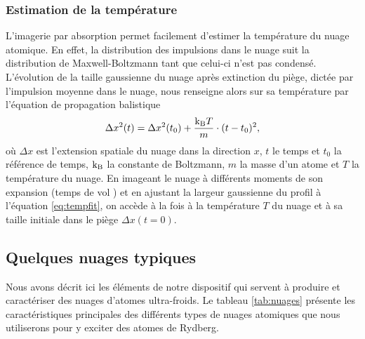 	\subsubsection*{Estimation de la température}
\noindent L'imagerie par absorption permet facilement d'estimer la température du nuage atomique.
En effet, la distribution des impulsions dans le nuage suit la distribution de Maxwell-Boltzmann tant que celui-ci n'est pas condensé.
L'évolution de la taille gaussienne du nuage après extinction du piège, dictée par l'impulsion moyenne dans le nuage,  nous renseigne alors sur sa température par l'équation de propagation balistique
\begin{equation}
\label{eq:tempfit}
\Delta x^2 (t) = \Delta x^2(t_0) + \frac{\mathrm{k_B} T}{m} \cdot (t-t_0)^2,
\end{equation}
où $\Delta x$ est l'extension spatiale du nuage dans la direction $x$, $t$ le temps et $t_0$ la référence de temps, $\mathrm{k_B}$ la constante de Boltzmann, $m$ la masse d'un atome et $T$ la température du nuage.
En imageant le nuage à différents moments de son expansion (\og temps de vol \fg{}) et en ajustant la largeur gaussienne du profil à l'équation \eqref{eq:tempfit}, on accède à la fois à la température $T$ du nuage et à sa taille initiale dans le piège $\Delta x(t=0)$.
		
	\subsection{Quelques nuages typiques}
\noindent Nous avons décrit ici les éléments de notre dispositif qui servent à produire et caractériser des nuages d'atomes ultra-froids.
Le tableau \ref{tab:nuages} présente les caractéristiques principales des différents types de nuages atomiques que nous utiliserons pour y exciter des atomes de Rydberg.

